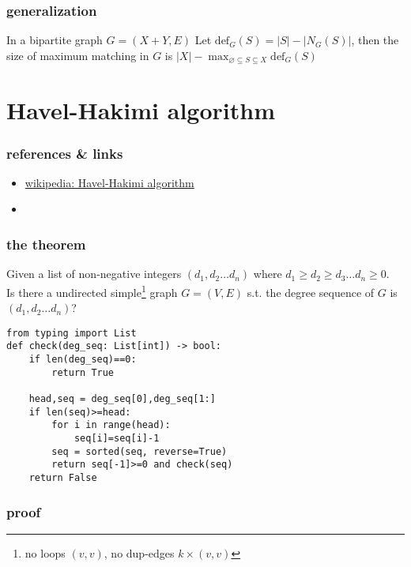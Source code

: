 \documentclass{article}
\begin{document}
\subsubsection{generalization}

In a bipartite graph $G=(X+Y,E)$
Let $\mathrm{def}_G(S)=|S|-|N_G(S)|$,
then the size of maximum matching in $G$ is $|X|-\max_{\varnothing\subseteq S\subseteq X}\mathrm{def}_G(S)$

\newpage
\section{Havel-Hakimi algorithm}

\subsubsection{references \& links}

\begin{itemize}
	\item \href{https://en.wikipedia.org/wiki/Havel\%E2\%80\%93Hakimi\_algorithm}{wikipedia: Havel-Hakimi algorithm}
	\item \href{https://en.wikipedia.org/wiki/Erd\%C5\%91s\%E2\%80\%93Gallai\_theorem}{}
\end{itemize}

\subsubsection{the theorem}

Given a list of non-negative integers $(d_1,d_2\ldots d_n)$ where $d_1\geq d_2\geq d_3\ldots d_n\geq 0$.\\
Is there a undirected simple\footnote{no loops $(v,v)$, no dup-edges $k\times (v,v)$} graph $G=(V,E)$ s.t. the degree sequence of $G$ is $(d_1,d_2\ldots d_n)$?

\begin{verbatim}
from typing import List
def check(deg_seq: List[int]) -> bool:
    if len(deg_seq)==0:
        return True

    head,seq = deg_seq[0],deg_seq[1:]
    if len(seq)>=head:
        for i in range(head):
            seq[i]=seq[i]-1
        seq = sorted(seq, reverse=True)
        return seq[-1]>=0 and check(seq)
    return False
\end{verbatim}

\subsubsection{proof}
\end{document}
